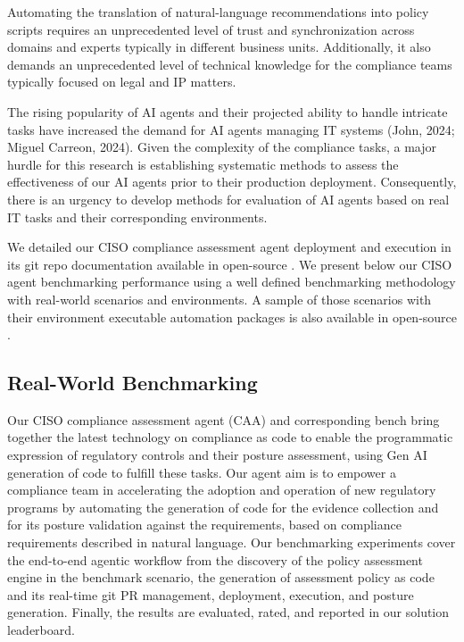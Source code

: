 Automating the translation of natural-language recommendations into policy scripts requires an unprecedented level of trust and synchronization across domains and experts typically in different business units. Additionally, it also demands an unprecedented level of technical knowledge for the compliance teams typically focused on legal and IP matters. 

The rising popularity of AI agents and their projected ability to handle intricate tasks have increased the demand for AI agents managing IT systems (John, 2024; Miguel Carreon, 2024). Given the complexity of the compliance tasks, a major hurdle for this research is establishing systematic methods to assess the effectiveness of our AI agents prior to their production deployment. Consequently, there is an urgency to develop
methods for evaluation of AI agents based on real IT tasks and their corresponding environments.

We detailed our CISO compliance assessment agent deployment and execution in its git repo documentation available in open-source \cite{CISO-CAAagentrepo}.
We present below our CISO agent benchmarking performance using a well defined benchmarking methodology with real-world scenarios and environments. A sample of those scenarios with their environment executable automation packages is also available in open-source \cite{CISO-CAAscenariorepo}.

\subsection{Real-World Benchmarking }

Our CISO compliance assessment agent (CAA) and corresponding bench bring together the latest technology on compliance as code to enable the programmatic expression of regulatory controls and their posture assessment, using Gen AI generation of code to fulfill these tasks. Our agent aim is to empower a compliance team in accelerating the adoption and operation of new regulatory programs by automating the generation of code for the evidence collection and for its posture validation against the requirements, based on compliance requirements described in natural language. Our benchmarking experiments cover the end-to-end agentic workflow from the discovery of the policy assessment engine in the benchmark scenario, the generation of assessment policy as code and its real-time git PR management, deployment,  execution, and posture generation. Finally, the results are evaluated, rated, and reported in our \bench solution leaderboard.

